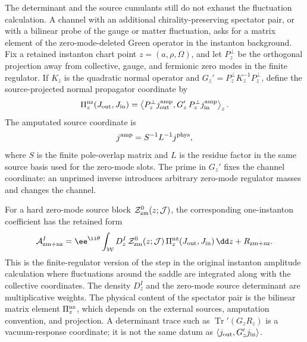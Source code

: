 \begin{controlledapproximation}
\label{ca:instanton-normal-propagator-source-insertion}
The determinant and the source cumulants still do not exhaust the fluctuation
calculation.  A channel with an additional chirality-preserving spectator
pair, or with a bilinear probe of the gauge or matter fluctuation, asks for a
matrix element of the zero-mode-deleted Green operator in the instanton
background.  Fix a retained instanton chart point \(z=(a,\rho,\Omega)\), and
let \(P_z^\perp\) be the orthogonal projection away from collective, gauge,
and fermionic zero modes in the finite regulator.  If \(K_z\) is the
quadratic normal operator and \(G_z'=P_z^\perp K_z^{-1}P_z^\perp\), define the
source-projected normal propagator coordinate by
\begin{equation}
  \Pi_z^{\rm nz}(J_{\rm out},J_{\rm in})
  =
  \left\langle
    P_z^\perp j_{\rm out}^{\rm amp},
    G_z'\,
    P_z^\perp j_{\rm in}^{\rm amp}
  \right\rangle_z .
  \label{eq:instanton-normal-propagator-projection}
\end{equation}
The amputated source coordinate is
\[
  j^{\rm amp}=S^{-1}L^{-1}j^{\rm phys},
\]
where \(S\) is the finite pole-overlap matrix and \(L\) is the residue
factor in the same source basis used for the zero-mode slots.  The prime in
\(G_z'\) fixes the channel coordinate: an unprimed inverse introduces
arbitrary zero-mode regulator masses and changes the channel.

For a hard zero-mode source block \(\mathcal Z_{\rm zm}^0(z;\mathcal J)\),
the corresponding one-instanton coefficient has the retained form
\begin{equation}
  \mathcal A_{\rm zm+nz}^{I}
  =
  \ee^{\ii\theta}
  \int_{\mathcal W}
  D_z^{I}\,
  \mathcal Z_{\rm zm}^0(z;\mathcal J)\,
  \Pi_z^{\rm nz}(J_{\rm out},J_{\rm in})\,
  \dd z
  +R_{\rm zm+nz}.
  \label{eq:instanton-zero-mode-normal-propagator-channel}
\end{equation}
This is the finite-regulator version of the step in the original instanton
amplitude calculation where fluctuations around the saddle are integrated
along with the collective coordinates.  The density \(D_z^{I}\) and the
zero-mode source determinant are multiplicative weights.  The physical
content of the spectator pair is the bilinear matrix element
\(\Pi_z^{\rm nz}\), which depends on the external sources, amputation
convention, and projection.  A determinant trace such as
\(\operatorname{Tr}'(G_zR_z)\) is a vacuum-response coordinate; it is not the
same datum as \(\langle j_{\rm out},G_z'j_{\rm in}\rangle\).


\end{controlledapproximation}
